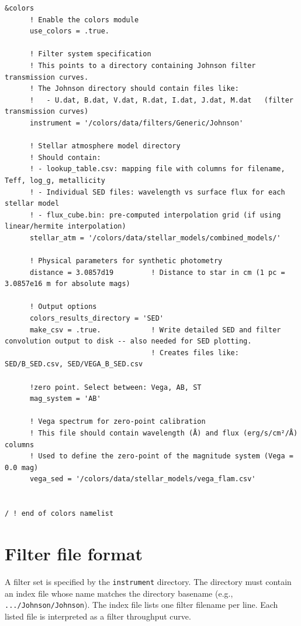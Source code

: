 \documentclass[linenumbers,apj,twocolumn, floatfix]{aastex701}
\begin{document}
\begin{verbatim}
&colors
      ! Enable the colors module
      use_colors = .true.
            
      ! Filter system specification
      ! This points to a directory containing Johnson filter transmission curves.
      ! The Johnson directory should contain files like:
      !   - U.dat, B.dat, V.dat, R.dat, I.dat, J.dat, M.dat   (filter transmission curves)
      instrument = '/colors/data/filters/Generic/Johnson'

      ! Stellar atmosphere model directory
      ! Should contain:
      ! - lookup_table.csv: mapping file with columns for filename, Teff, log_g, metallicity
      ! - Individual SED files: wavelength vs surface flux for each stellar model
      ! - flux_cube.bin: pre-computed interpolation grid (if using linear/hermite interpolation)
      stellar_atm = '/colors/data/stellar_models/combined_models/'

      ! Physical parameters for synthetic photometry
      distance = 3.0857d19         ! Distance to star in cm (1 pc = 3.0857e16 m for absolute mags)
      
      ! Output options
      colors_results_directory = 'SED'
      make_csv = .true.            ! Write detailed SED and filter convolution output to disk -- also needed for SED plotting.
                                   ! Creates files like: SED/B_SED.csv, SED/VEGA_B_SED.csv

      !zero point. Select between: Vega, AB, ST
      mag_system = 'AB'

      ! Vega spectrum for zero-point calibration
      ! This file should contain wavelength (Å) and flux (erg/s/cm²/Å) columns
      ! Used to define the zero-point of the magnitude system (Vega = 0.0 mag)
      vega_sed = '/colors/data/stellar_models/vega_flam.csv'


/ ! end of colors namelist
\end{verbatim}


\section{Filter file format}

A filter set is specified by the \texttt{instrument} directory. The directory must contain an index file whose name matches the directory basename (e.g., \texttt{.../Johnson/Johnson}). The index file lists one filter filename per line. Each listed file is interpreted as a filter throughput curve.
\end{document}
